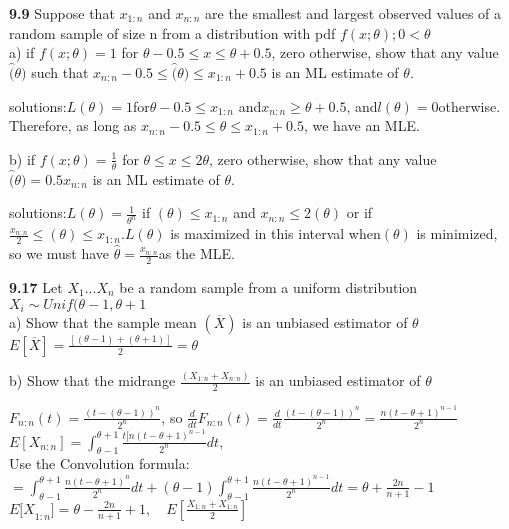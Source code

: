 \noindent \textbf{9.9} Suppose that $x_{1:n}$ and $x_{n:n}$ are the smallest and largest observed values of a random sample of size n from a distribution with pdf $f(x;\theta); 0<\theta$\\

a) if $f(x;\theta)=1$ for $\theta-0.5 \le x \le \theta +0.5$, zero otherwise, show that any value $\hat(\theta)$ such that $x_{n:n}-0.5 \le \hat(\theta) \le x_{1:n}+0.5$ is an ML estimate of $\theta$.


solutions:$L(\theta )=1 $for$\theta-0.5\le { x }_{ 1:n }$ and$ { x }_{ n:n }\ge \theta +0.5$, and$ l(\theta) = 0 $otherwise. Therefore, as long as $ {x}_{n:n}-0.5 \le \hat { \theta  } \le {x}_{1:n}+0.5$, we have an MLE.



b) if $f(x;\theta)=\frac{1}{\theta}$ for $\theta \le x \le 2\theta$, zero otherwise, show that any value $\hat(\theta)=0.5x_{n:n}$ is an ML estimate of $\theta$.

solutions:$ L(\theta)=\frac { 1 }{ { \theta  }^{ n } }$ if $(\theta) \le {x}_{1:n}$ and ${x}_{n:n}\le 2(\theta) $ or if$ \frac { { x }_{ n:n } }{ 2 } \le (\theta) \le {x}_{1:n}. L(\theta)$ is maximized in this interval when$ (\theta)$ is minimized, so we must have $\hat { \theta  } = \frac { { x }_{ n:n } }{ 2 } $as the MLE.




\noindent \textbf{9.17} Let $X_{1}...X_{n}$ be a random sample from a uniform distribution $X_{i} \sim Unif(\theta-1,\theta+1$\\

a) Show that the sample mean $(\overline{X})$ is an unbiased estimator of $\theta$\\

$E[\overline{X}]=\frac{[(\theta-1)+(\theta+1)]}{2}=\theta$

b) Show that the midrange  $\frac{(X_{1:n}+X_{n:n})}{2}$ is an unbiased estimator of $\theta$

$F_{n:n}(t)=\frac{(t-(\theta-1))^{n}}{2^{n}}$, so $\frac { d }{ dt } F_{ n:n }(t)=\frac { d }{ dt } \frac { (t-(\theta -1))^{ n } }{ 2^{ n } } =\frac { n(t-\theta +1)^{ n-1 } }{ 2^{ n } } $\\

$E[{ X }_{ n:n }]=\int _{ \theta -1 }^{ \theta +1 }{ \frac { t[n{ (t-\theta +1) }^{ n-1 } }{ { 2 }^{ n } }  } dt$,\\ Use the Convolution formula: $=\int _{ \theta -1 }^{ \theta +1 }{ \frac { n{ (t-\theta +1) }^{ n } }{ { 2 }^{ n } }  } dt+(\theta -1)\int _{ \theta -1 }^{ \theta +1 }{ \frac { n{ (t-\theta +1) }^{ n-1 } }{ { 2 }^{ n } }  } dt=\theta +\frac { 2n }{ n+1 } -1$\\

${ E[X }_{ 1:n }]=\theta -\frac { 2n }{ n+1 } +1,\quad E[\frac { { X }_{ 1:n }+{ X }_{ 1:n } }{ 2 } ]$